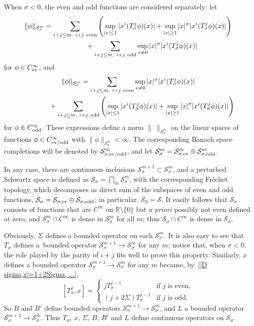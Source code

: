 \documentclass[pdftex]{sigma}
\newcommand{\R}{\mathbb{R}}
\renewcommand{\SS}{\mathcal{S}}
\newcommand{\Cinf}{C^\infty}
\begin{document}
When $\sigma<0$, the even and odd functions are considered separately: let
  \begin{gather}
    \|\phi\|_{\SS_\sigma^m}
    =\sum_{i+j\le m,\ i+j\ \text{even}}\left(\sup_{|x|\le1}|x^i(T_\sigma^j\phi)(x)|
    +\sup_{|x|\ge1}|x|^\sigma |x^i(T_\sigma^j\phi)(x)|\right)\nonumber\\
\hphantom{\|\phi\|_{\SS_\sigma^m}=}{}+\sum_{i+j\le m,\ i+j\ \text{odd}}\sup_{x\ne0}|x|^\sigma |x^i(T_\sigma^j\phi)(x)|\label{SS_sigma,even^m, sigma<0}
   \end{gather}
for $\phi\in\Cinf_{\text{\rm ev}}$, and
  \begin{gather}
    \|\phi\|_{\SS_\sigma^m}
    =\sum_{i+j\le m,\ i+j\ \text{even}}\sup_{x\ne0}|x|^\sigma |x^i(T_\sigma^j\phi)(x)|\nonumber\\
\hphantom{\|\phi\|_{\SS_\sigma^m}=}{}+\sum_{i+j\le m,\ i+j\ \text{odd}}\left(\sup_{|x|\le1}|x^i(T_\sigma^j\phi)(x)|
    +\sup_{|x|\ge1}|x|^\sigma |x^i(T_\sigma^j\phi)(x)|\right)\label{SS_sigma,odd^m, sigma<0}
  \end{gather}
for $\phi\in\Cinf_{\text{\rm odd}}$. These expressions def\/ine a norm
$\|\ \|_{\SS_\sigma^m}$ on the linear spaces of
functions $\phi\in\Cinf_{\text{\rm ev/odd}}$ with
$\|\phi\|_{\SS_\sigma^m}<\infty$. The corresponding
Banach space completions will be denoted by $\SS_{\sigma,\text{\rm
ev/odd}}^m$, and let $\SS_\sigma^m=\SS_{\sigma,\text{\rm ev}}^m\oplus\SS_{\sigma,\text{\rm odd}}^m$.

In any case, there are continuous inclusions
$\SS_\sigma^{m+1}\subset\SS_\sigma^m$, and a perturbed Schwartz space is def\/ined as $\SS_\sigma=\bigcap_m\SS_\sigma^m$, with the corresponding Fr\'echet topology, which decomposes as direct sum of the subspaces of even and odd functions, $\SS_\sigma=\SS_{\sigma,\text{\rm ev}}\oplus\SS_{\sigma,\text{\rm odd}}$; in particular, $\SS_0=\SS$.  It easily follows
that $\SS_\sigma$ consists of functions that are $\Cinf$ on $\R\setminus\{0\}$ but \textit{a priori} possibly not even def\/ined at zero, and $\SS_\sigma^m\cap\Cinf$ is dense in $\SS_\sigma^m$ for all $m$; thus $\SS_\sigma\cap\Cinf$ is dense in $\SS_\sigma$.

Obviously, $\Sigma$ def\/ines a bounded operator on each $\SS_\sigma^m$. It is also easy to see that $T_\sigma$ def\/ines a~bounded operator $\SS_\sigma^{m+1}\to\SS_\sigma^m$ for any $m$; notice that, when $\sigma<0$, the role played by the parity of $i+j$ f\/its well to prove this property. Similarly, $x$ def\/ines a bounded operator $\SS_\sigma^{m+1}\to\SS_\sigma^m$ for any $m$ because, by~\eqref{[D sigma,x]=1+2Sigma, ...},
  \[
    [T_\sigma^j,x]=
      \begin{cases}
        jT_\sigma^{j-1} & \text{if $j$ is even},\\
        (j+2\Sigma)T_\sigma^{j-1} & \text{if $j$ is odd}.
      \end{cases}
  \]
So $B$ and $B'$ def\/ine bounded operators $\SS_\sigma^{m+1}\to\SS_\sigma^m$, and $L$ a bounded operator $\SS_\sigma^{m+2}\to\SS_\sigma^m$. Thus $T_\sigma$, $x$, $\Sigma$, $B$, $B'$ and $L$ def\/ine continuous operators on $\SS_\sigma$.
\end{document}
